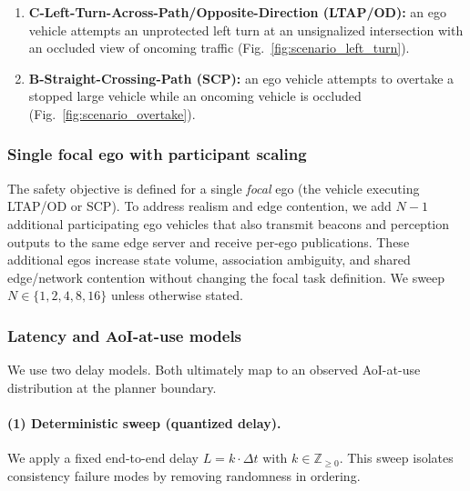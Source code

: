\begin{enumerate}[label=\arabic*.,noitemsep,topsep=0pt,leftmargin=1.2\parindent]
    \item \textbf{C-Left-Turn-Across-Path/Opposite-Direction (LTAP/OD):}
    an ego vehicle attempts an unprotected left turn at an unsignalized intersection with an occluded view of oncoming traffic (Fig.~\ref{fig:scenario_left_turn}).
    \item \textbf{B-Straight-Crossing-Path (SCP):}
    an ego vehicle attempts to overtake a stopped large vehicle while an oncoming vehicle is occluded (Fig.~\ref{fig:scenario_overtake}).
\end{enumerate}




\subsubsection{Single focal ego with participant scaling}
\label{sec:eval:scaling}

The safety objective is defined for a single \emph{focal} ego (the vehicle executing LTAP/OD or SCP). To address realism and edge contention, we add $N{-}1$ additional participating ego vehicles that also transmit beacons and perception outputs to the same edge server and receive per-ego publications. These additional egos increase state volume, association ambiguity, and shared edge/network contention without changing the focal task definition. We sweep $N \in \{1,2,4,8,16\}$ unless otherwise stated.

\subsubsection{Latency and AoI-at-use models}
\label{sec:e2e_lat_model}
We use two delay models. Both ultimately map to an observed AoI-at-use distribution at the planner boundary.

\paragraph{(1) Deterministic sweep (quantized delay).}
We apply a fixed end-to-end delay $L = k\cdot \Delta t$ with $k \in \mathbb{Z}_{\ge 0}$. This sweep isolates consistency failure modes by removing randomness in ordering.

